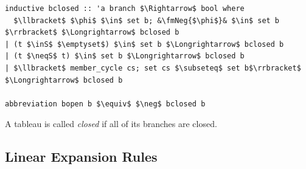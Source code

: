 \documentclass[runningheads]{llncs}
\newcommand{\inS}{\in_\text{s}}
\newcommand{\neqS}{\neq_\text{s}}
\newcommand{\fmNegSymbol}{\boldsymbol{\neg}}
\newcommand{\fmNeg}[1]{$\fmNegSymbol\:$#1}
\begin{document}
\begin{lstlisting}
inductive bclosed :: 'a branch $\Rightarrow$ bool where
  $\llbracket$ $\phi$ $\in$ set b; &\fmNeg{$\phi$}& $\in$ set b $\rrbracket$ $\Longrightarrow$ bclosed b
| (t $\inS$ $\emptyset$) $\in$ set b $\Longrightarrow$ bclosed b
| (t $\neqS$ t) $\in$ set b $\Longrightarrow$ bclosed b
| $\llbracket$ member_cycle cs; set cs $\subseteq$ set b$\rrbracket$ $\Longrightarrow$ bclosed b

abbreviation bopen b $\equiv$ $\neg$ bclosed b
\end{lstlisting}
A tableau is called \emph{closed} if all of its branches are closed.

\subsection{Linear Expansion Rules}
\end{document}
